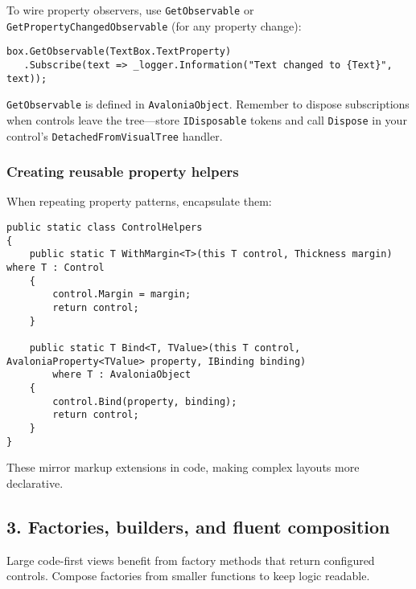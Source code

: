 To wire property observers, use \passthrough{\lstinline!GetObservable!}
or \passthrough{\lstinline!GetPropertyChangedObservable!} (for any
property change):

\begin{lstlisting}
box.GetObservable(TextBox.TextProperty)
   .Subscribe(text => _logger.Information("Text changed to {Text}", text));
\end{lstlisting}

\passthrough{\lstinline!GetObservable!} is defined in
\passthrough{\lstinline!AvaloniaObject!}. Remember to dispose
subscriptions when controls leave the tree---store
\passthrough{\lstinline!IDisposable!} tokens and call
\passthrough{\lstinline!Dispose!} in your control's
\passthrough{\lstinline!DetachedFromVisualTree!} handler.

\subsubsection{Creating reusable property
helpers}\label{creating-reusable-property-helpers}

When repeating property patterns, encapsulate them:

\begin{lstlisting}
public static class ControlHelpers
{
    public static T WithMargin<T>(this T control, Thickness margin) where T : Control
    {
        control.Margin = margin;
        return control;
    }

    public static T Bind<T, TValue>(this T control, AvaloniaProperty<TValue> property, IBinding binding)
        where T : AvaloniaObject
    {
        control.Bind(property, binding);
        return control;
    }
}
\end{lstlisting}

These mirror markup extensions in code, making complex layouts more
declarative.

\subsection{3. Factories, builders, and fluent
composition}\label{factories-builders-and-fluent-composition}

Large code-first views benefit from factory methods that return
configured controls. Compose factories from smaller functions to keep
logic readable.

